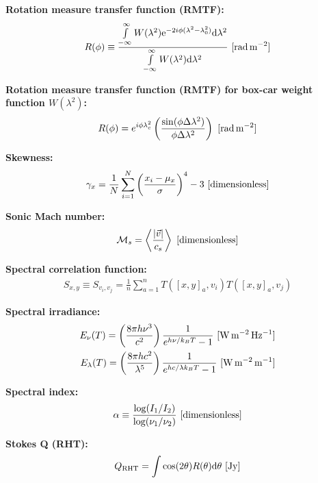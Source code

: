 \documentclass[a4paper,10pt]{article}
\begin{document}
{\noindent}\textbf{Rotation measure transfer function (RMTF):}
\begin{align*}
R(\phi) \equiv \dfrac{\int\limits_{-\infty}^\infty W(\lambda^2)\mathrm{e}^{-2i\phi(\lambda^2-\lambda_0^2)}\mathrm{d}\lambda^2}{\int\limits_{-\infty}^\infty W(\lambda^2)\mathrm{d}\lambda^2} ~ [{\rm rad\,m^{-2}}]
\end{align*}

{\noindent}\textbf{Rotation measure transfer function (RMTF) for box-car weight function $W(\lambda^2)$:}
\begin{align*}
    R(\phi) = e^{i\phi\lambda_c^2}\left(\dfrac{\sin(\phi\Delta\lambda^2)}{\phi\Delta\lambda^2}\right) ~ [{\rm rad\,m^{-2}}]
\end{align*}

{\noindent}\textbf{Skewness:}
\begin{align*}
    \gamma_x = \frac{1}{N} \sum_{i=1}^N \left(\frac{x_i-\mu_x}{\sigma}\right)^4 -3 ~ [{\rm dimensionless}]
\end{align*}

{\noindent}\textbf{Sonic Mach number:}
\begin{align*}
    \mathcal{M}_s = \left\langle\frac{\lvert\vec{v}\rvert}{c_s}\right\rangle ~ [{\rm dimensionless}]
\end{align*}

{\noindent}\textbf{Spectral correlation function:}
\begin{align*}
    S_{x,y} \equiv S_{v_i,v_j} = \frac{1}{n}\sum_{a=1}^n T([x,y]_a,v_i)T([x,y]_a,v_j)
\end{align*}

{\noindent}\textbf{Spectral irradiance:}
\begin{align*}
    E_\nu(T) = \left(\frac{8\pi h\nu^3}{c^2}\right) \frac{1}{e^{h\nu/k_BT}-1} ~ [{\rm W\,m^{-2}\,Hz^{-1}}] \\
    E_\lambda(T) = \left(\frac{8\pi hc^2}{\lambda^5}\right) \frac{1}{e^{hc/\lambda k_BT}-1} ~ [{\rm W\,m^{-2}\,m^{-1}}]
\end{align*}

{\noindent}\textbf{Spectral index:}
\begin{align*}
    \alpha \equiv \frac{\log(I_1/I_2)}{\log(\nu_1/\nu_2)} ~ [{\rm dimensionless}]
\end{align*}

{\noindent}\textbf{Stokes Q (RHT):}
\begin{align*}
    Q_\mathrm{RHT} = \int\cos(2\theta)R(\theta)\mathrm{d}\theta ~ [{\rm Jy}]
\end{align*}
\end{document}
